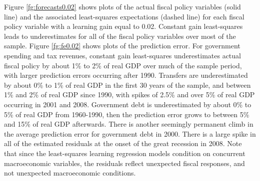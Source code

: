 \documentclass[11pt]{article}
\begin{document}
Figure \ref{fg:forecasts0.02} shows plots of the actual fiscal policy variables (solid line) and the associated least-squares expectations (dashed line) for each fiscal policy variable with a learning gain equal to 0.02.  Constant gain least-squares leads to underestimates for all of the fiscal policy variables over most of the sample.  Figure \ref{fg:fe0.02} shows plots of the prediction error.  For government spending and tax revenues, constant gain least-squares underestimates actual fiscal policy by about 1\% to 2\% of real GDP over much of the sample period, with larger prediction errors occurring after 1990.  Transfers are underestimated by about 0\% to 1\% of real GDP in the first 30 years of the sample, and between 1\% and 2\% of real GDP since 1990, with spikes of 2.5\% and over 5\% of real GDP occurring in 2001 and 2008.  Government debt is underestimated by about 0\% to 5\% of real GDP from 1960-1990, then the prediction error grows to between 5\% and 15\% of real GDP afterwards.  There is another seemingly permanent climb in the average prediction error for government debt in 2000.  There is a large spike in all of the estimated residuals at the onset of the great recession in 2008.  Note that since the least-squares learning regression models condition on concurrent macroeconomic variables, the residuals reflect unexpected fiscal responses, and not unexpected macroeconomic conditions.
\end{document}
